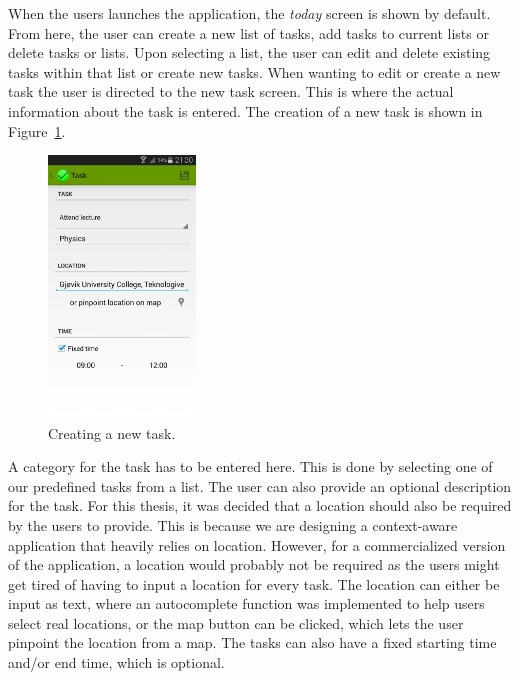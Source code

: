 When the users launches the application, the \emph{today} screen is shown by default. From here, the user can create a new list of tasks, add tasks to current lists or delete tasks or lists. Upon selecting a list, the user can edit and delete existing tasks within that list or create new tasks. When wanting to edit or create a new task the user is directed to the new task screen. This is where the actual information about the task is entered. The creation of a new task is shown in Figure~\ref{fig:newtask}.
\begin{figure}[tbp]
  \centering
  \includegraphics[width=0.35\textwidth]{figures/NewTask.png}
  \caption[Screen for creating a new task]{Creating a new task.}
  \label{fig:newtask}
\end{figure}
A category for the task has to be entered here. This is done by selecting one of our predefined tasks from a list. The user can also provide an optional description for the task. For this thesis, it was decided that a location should also be required by the users to provide. This is because we are designing a context-aware application that heavily relies on location. However, for a commercialized version of the application, a location would probably not be required as the users might get tired of having to input a location for every task. The location can either be input as text, where an autocomplete function was implemented to help users select real locations, or the map button can be clicked, which lets the user pinpoint the location from a map. The tasks can also have a fixed starting time and/or end time, which is optional.

